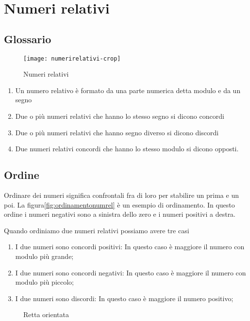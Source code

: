 \chapter{Numeri relativi}
\label{sha:numerirelativi}
\section{Glossario}
\begin{figure}
	\centering
	\texttt{[image: numerirelativi-crop]}
	\caption{Numeri relativi}
	\label{fig:numORealativi}
\end{figure}
\begin{enumerate}
	\item Un numero relativo è formato da una parte numerica detta modulo e da un segno
	\item Due o più numeri relativi che hanno lo stesso segno si dicono concordi
	\item Due o più numeri relativi che hanno  segno diverso si dicono discordi
	\item Due numeri relativi concordi che hanno lo stesso modulo si dicono opposti.
\end{enumerate}
\section{Ordine}
Ordinare dei numeri significa confrontali fra di loro per stabilire un prima e un poi. La figura\nobs\vref{fig:ordinamentonumrel} è un esempio di ordinamento. In questo ordine i numeri negativi sono a sinistra dello zero e i numeri positivi a destra. 

Quando ordiniamo due numeri relativi possiamo avere tre casi
\begin{enumerate}
	\item I due numeri sono concordi positivi: In questo caso è maggiore il numero con modulo più grande;
	\item I due numeri sono concordi negativi: In questo caso è maggiore il numero con modulo più piccolo;
	\item  I due numeri sono discordi: In questo caso è maggiore il numero positivo;
\end{enumerate}
\begin{figure} 
	\centering

	\caption{Retta orientata}
	\label{fig:ordinamentonumrel}\end{figure}
